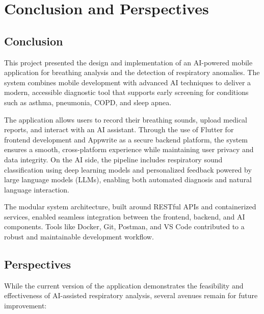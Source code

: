 \chapter*{Conclusion and Perspectives}

\section*{Conclusion}

This project presented the design and implementation of an AI-powered mobile application for breathing analysis and the detection of respiratory anomalies. The system combines mobile development with advanced AI techniques to deliver a modern, accessible diagnostic tool that supports early screening for conditions such as asthma, pneumonia, COPD, and sleep apnea.

The application allows users to record their breathing sounds, upload medical reports, and interact with an AI assistant. Through the use of Flutter for frontend development and Appwrite as a secure backend platform, the system ensures a smooth, cross-platform experience while maintaining user privacy and data integrity. On the AI side, the pipeline includes respiratory sound classification using deep learning models and personalized feedback powered by large language models (LLMs), enabling both automated diagnosis and natural language interaction.

The modular system architecture, built around RESTful APIs and containerized services, enabled seamless integration between the frontend, backend, and AI components. Tools like Docker, Git, Postman, and VS Code contributed to a robust and maintainable development workflow.

\section*{Perspectives}

While the current version of the application demonstrates the feasibility and effectiveness of AI-assisted respiratory analysis, several avenues remain for future improvement:

